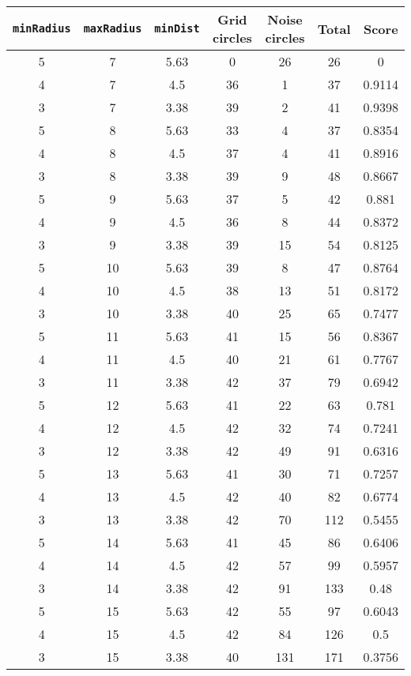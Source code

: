 \documentclass[letterpaper, 12pt]{article}
\begin{document}
\begin{longtable}{|c|c|c|c|c|c|c|}
\hline
\textbf{\texttt{minRadius}} & \textbf{\texttt{maxRadius}} & \textbf{\texttt{minDist}} & \textbf{Grid circles} & \textbf{Noise circles} & \textbf{Total} & \textbf{Score} \\
\hline
5 & 7 & 5.63 & 0 & 26 & 26 & 0 \\
\hline
4 & 7 & 4.5 & 36 & 1 & 37 & 0.9114 \\
\hline
3 & 7 & 3.38 & 39 & 2 & 41 & 0.9398 \\
\hline
5 & 8 & 5.63 & 33 & 4 & 37 & 0.8354 \\
\hline
4 & 8 & 4.5 & 37 & 4 & 41 & 0.8916 \\
\hline
3 & 8 & 3.38 & 39 & 9 & 48 & 0.8667 \\
\hline
5 & 9 & 5.63 & 37 & 5 & 42 & 0.881 \\
\hline
4 & 9 & 4.5 & 36 & 8 & 44 & 0.8372 \\
\hline
3 & 9 & 3.38 & 39 & 15 & 54 & 0.8125 \\
\hline
5 & 10 & 5.63 & 39 & 8 & 47 & 0.8764 \\
\hline
4 & 10 & 4.5 & 38 & 13 & 51 & 0.8172 \\
\hline
3 & 10 & 3.38 & 40 & 25 & 65 & 0.7477 \\
\hline
5 & 11 & 5.63 & 41 & 15 & 56 & 0.8367 \\
\hline
4 & 11 & 4.5 & 40 & 21 & 61 & 0.7767 \\
\hline
3 & 11 & 3.38 & 42 & 37 & 79 & 0.6942 \\
\hline
5 & 12 & 5.63 & 41 & 22 & 63 & 0.781 \\
\hline
4 & 12 & 4.5 & 42 & 32 & 74 & 0.7241 \\
\hline
3 & 12 & 3.38 & 42 & 49 & 91 & 0.6316 \\
\hline
5 & 13 & 5.63 & 41 & 30 & 71 & 0.7257 \\
\hline
4 & 13 & 4.5 & 42 & 40 & 82 & 0.6774 \\
\hline
3 & 13 & 3.38 & 42 & 70 & 112 & 0.5455 \\
\hline
5 & 14 & 5.63 & 41 & 45 & 86 & 0.6406 \\
\hline
4 & 14 & 4.5 & 42 & 57 & 99 & 0.5957 \\
\hline
3 & 14 & 3.38 & 42 & 91 & 133 & 0.48 \\
\hline
5 & 15 & 5.63 & 42 & 55 & 97 & 0.6043 \\
\hline
4 & 15 & 4.5 & 42 & 84 & 126 & 0.5 \\
\hline
3 & 15 & 3.38 & 40 & 131 & 171 & 0.3756 \\

\end{longtable}
\end{document}
